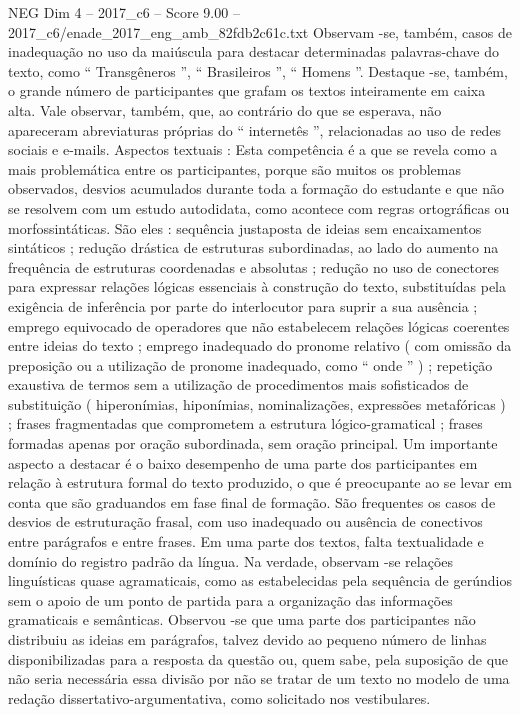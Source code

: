 \begin{textsample}{NEG Dim 4 – 2017\_c6 – Score 9.00 – 2017\_c6/enade\_2017\_eng\_amb\_82fdb2c61c.txt}
Observam -se, também, casos de inadequação no uso da maiúscula para destacar determinadas palavras-chave do texto, como “ Transgêneros ”, “ Brasileiros ”, “ Homens ”.
Destaque -se, também, o grande número de participantes que grafam os textos inteiramente em caixa alta.
Vale observar, também, que, ao contrário do que se esperava, não apareceram abreviaturas próprias do “ internetês ”, relacionadas ao uso de redes sociais e e-mails.
Aspectos textuais : Esta competência é a que se revela como a mais problemática entre os participantes, porque são muitos os problemas observados, desvios acumulados durante toda a formação do estudante e que não se resolvem com um estudo autodidata, como acontece com regras ortográficas ou morfossintáticas.
São eles : sequência justaposta de ideias sem encaixamentos sintáticos ; redução drástica de estruturas subordinadas, ao lado do aumento na frequência de estruturas coordenadas e absolutas ; redução no uso de conectores para expressar relações lógicas essenciais à construção do texto, substituídas pela exigência de inferência por parte do interlocutor para suprir a sua ausência ; emprego equivocado de operadores que não estabelecem relações lógicas coerentes entre ideias do texto ; emprego inadequado do pronome relativo ( com omissão da preposição ou a utilização de pronome inadequado, como “ onde ” ) ; repetição exaustiva de termos sem a utilização de procedimentos mais sofisticados de substituição ( hiperonímias, hiponímias, nominalizações, expressões metafóricas ) ; frases fragmentadas que comprometem a estrutura lógico-gramatical ; frases formadas apenas por oração subordinada, sem oração principal.
Um importante aspecto a destacar é o baixo desempenho de uma parte dos participantes em relação à estrutura formal do texto produzido, o que é preocupante ao se levar em conta que são graduandos em fase final de formação.
São frequentes os casos de desvios de estruturação frasal, com uso inadequado ou ausência de conectivos entre parágrafos e entre frases.
Em uma parte dos textos, falta textualidade e domínio do registro padrão da língua.
Na verdade, observam -se relações linguísticas quase agramaticais, como as estabelecidas pela sequência de gerúndios sem o apoio de um ponto de partida para a organização das informações gramaticais e semânticas.
Observou -se que uma parte dos participantes não distribuiu as ideias em parágrafos, talvez devido ao pequeno número de linhas disponibilizadas para a resposta da questão ou, quem sabe, pela suposição de que não seria necessária essa divisão por não se tratar de um texto no modelo de uma redação dissertativo-argumentativa, como solicitado nos vestibulares.

\end{textsample}
